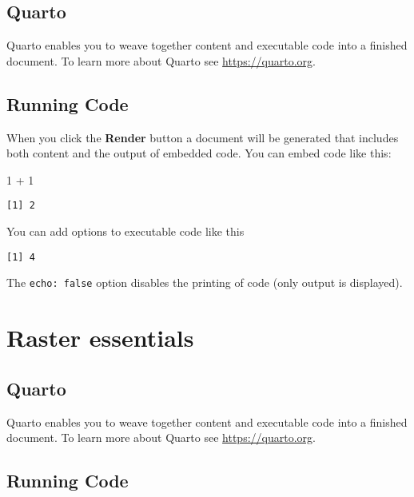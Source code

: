 \documentclass[
  letterpaper,
  DIV=11,
  numbers=noendperiod]{scrreprt}
\newenvironment{Shaded}{\begin{snugshade}}{\end{snugshade}}
\newcommand{\DecValTok}[1]{\textcolor[rgb]{0.68,0.00,0.00}{#1}}
\newcommand{\SpecialCharTok}[1]{\textcolor[rgb]{0.37,0.37,0.37}{#1}}
\begin{document}
\hypertarget{quarto-3}{%
\section{Quarto}\label{quarto-3}}

Quarto enables you to weave together content and executable code into a
finished document. To learn more about Quarto see
\url{https://quarto.org}.

\hypertarget{running-code-3}{%
\section{Running Code}\label{running-code-3}}

When you click the \textbf{Render} button a document will be generated
that includes both content and the output of embedded code. You can
embed code like this:

\begin{Shaded}
\begin{Highlighting}[]
\DecValTok{1} \SpecialCharTok{+} \DecValTok{1}
\end{Highlighting}
\end{Shaded}

\begin{verbatim}
[1] 2
\end{verbatim}

You can add options to executable code like this

\begin{verbatim}
[1] 4
\end{verbatim}

The \texttt{echo:\ false} option disables the printing of code (only
output is displayed).

\hypertarget{raster-essentials}{%
\chapter{Raster essentials}\label{raster-essentials}}

\hypertarget{quarto-4}{%
\section{Quarto}\label{quarto-4}}

Quarto enables you to weave together content and executable code into a
finished document. To learn more about Quarto see
\url{https://quarto.org}.

\hypertarget{running-code-4}{%
\section{Running Code}\label{running-code-4}}
\end{document}
